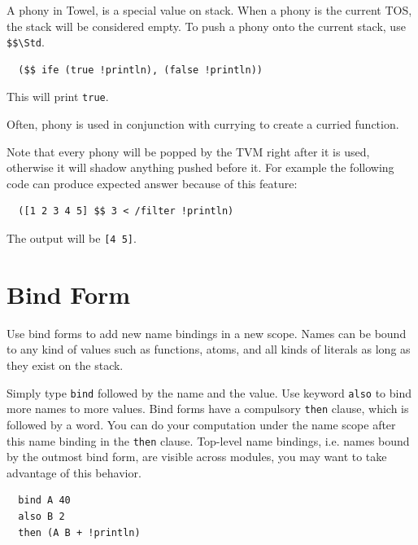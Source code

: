\documentclass{report}
\newcommand{\mstd}[1]{\texttt{#1\textbackslash Std}}
\begin{document}
A phony in Towel, is a special value on stack. When a phony is the current TOS, the stack will be considered empty. To push a phony onto the current stack, use \mstd{\$\$}.

\begin{mdframed}[style=example]
\begin{verbatim}
  ($$ ife (true !println), (false !println))
\end{verbatim}
  This will print \texttt{true}.
\end{mdframed}

Often, phony is used in conjunction with currying to create a curried function.

\begin{mdframed}[style=hint]
  Note that every phony will be popped by the TVM right after it is used, otherwise it will shadow anything pushed before it. For example the following code can produce expected answer because of this feature:

\begin{verbatim}
  ([1 2 3 4 5] $$ 3 < /filter !println)
\end{verbatim}

The output will be \texttt{[4 5]}.
\end{mdframed}

\section{Bind Form}

Use bind forms to add new name bindings in a new scope. Names can be bound to any kind of values such as functions, atoms, and all kinds of literals as long as they exist on the stack.

Simply type \texttt{bind} followed by the name and the value. Use keyword \texttt{also} to bind more names to more values. Bind forms have a compulsory \texttt{then} clause, which is followed by a word. You can do your computation under the name scope after this name binding in the \texttt{then} clause. Top-level name bindings, i.e. names bound by the outmost bind form, are visible across modules, you may want to take advantage of this behavior.

\begin{mdframed}[style=example]
\begin{verbatim}
  bind A 40
  also B 2
  then (A B + !println)
\end{verbatim}
\end{mdframed}
\end{document}
